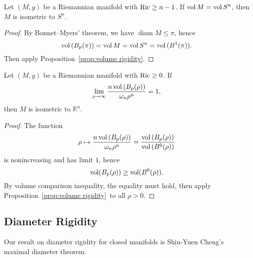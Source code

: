 \begin{thm}
    Let $(M,g)$ be a Riemannian manifold with $\operatorname{Ric}\geq n-1$.
    If $\operatorname{vol}{M}=\operatorname{vol}{S^n}$, then $M$ is isometric to $S^n$.
\end{thm}
\begin{proof}
    By Bonnet--Myers' theorem, we have $\operatorname{diam}{M}\leq\pi$, hence
    \[\operatorname{vol}{(B_p(\pi))}=\operatorname{vol}{M}=\operatorname{vol}{S^n}=\operatorname{vol}{(B^1(\pi))}.\]
    Then apply Proposition~\ref{prop:volume rigidity}.
\end{proof}

\begin{thm}
    Let $(M,g)$ be a Riemannian manifold with $\operatorname{Ric}\geq 0$.
    If
    \[\lim_{\rho\to\infty}\frac{n\operatorname{vol}{(B_p(\rho))}}{\omega_n\rho^n}=1,\]
    then $M$ is isometric to $\mathbb{R}^n$.
\end{thm}
\begin{proof}
    The function
    \[\rho\mapsto\frac{n\operatorname{vol}{(B_p(\rho))}}{\omega_n\rho^n}=\frac{\operatorname{vol}{(B_p(\rho))}}{\operatorname{vol}{(B^0(\rho))}}\]
    is nonincreasing and has limit $1$, hence
    \[\operatorname{vol}(B_p(\rho))\geq\operatorname{vol}(B^0(\rho)).\]
    By volume comparison inequality, the equality must hold, then apply Proposition~\ref{prop:volume rigidity}~to all $\rho>0$.
\end{proof}

\subsection{Diameter Rigidity}

Our result on diameter rigidity for closed manifolds is Shiu-Yuen Cheng's maximal diameter theorem.

